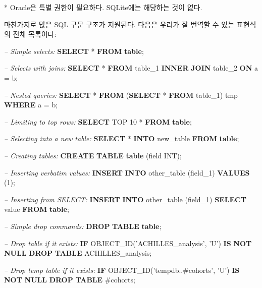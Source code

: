 \documentclass[10.5pt]{book}
\newenvironment{Shaded}{\begin{snugshade}}{\end{snugshade}}
\newcommand{\KeywordTok}[1]{\textcolor[rgb]{0.13,0.29,0.53}{\textbf{#1}}}
\newcommand{\DataTypeTok}[1]{\textcolor[rgb]{0.13,0.29,0.53}{#1}}
\newcommand{\DecValTok}[1]{\textcolor[rgb]{0.00,0.00,0.81}{#1}}
\newcommand{\StringTok}[1]{\textcolor[rgb]{0.31,0.60,0.02}{#1}}
\newcommand{\CommentTok}[1]{\textcolor[rgb]{0.56,0.35,0.01}{\textit{#1}}}
\newcommand{\FunctionTok}[1]{\textcolor[rgb]{0.00,0.00,0.00}{#1}}
\newcommand{\NormalTok}[1]{#1}
\theoremstyle{definition}
\theoremstyle{definition}
\theoremstyle{definition}
\theoremstyle{remark}
\begin{document}
* Oracle은 특별 권한이 필요하다. SQLite에는 해당하는 것이 없다.

마찬가지로 많은 SQL 구문 구조가 지원된다. 다음은 우리가 잘 번역할 수
있는 표현식의 전체 목록이다:

\begin{Shaded}
\begin{Highlighting}[]
\CommentTok{-- Simple selects:}
\KeywordTok{SELECT}\NormalTok{ * }\KeywordTok{FROM} \KeywordTok{table}\NormalTok{;}

\CommentTok{-- Selects with joins:}
\KeywordTok{SELECT}\NormalTok{ * }\KeywordTok{FROM}\NormalTok{ table_1 }\KeywordTok{INNER} \KeywordTok{JOIN}\NormalTok{ table_2 }\KeywordTok{ON}\NormalTok{ a = b;}

\CommentTok{-- Nested queries:}
\KeywordTok{SELECT}\NormalTok{ * }\KeywordTok{FROM}\NormalTok{ (}\KeywordTok{SELECT}\NormalTok{ * }\KeywordTok{FROM}\NormalTok{ table_1) tmp }\KeywordTok{WHERE}\NormalTok{ a = b;}

\CommentTok{-- Limiting to top rows:}
\KeywordTok{SELECT}\NormalTok{ TOP }\DecValTok{10}\NormalTok{ * }\KeywordTok{FROM} \KeywordTok{table}\NormalTok{;}

\CommentTok{-- Selecting into a new table:}
\KeywordTok{SELECT}\NormalTok{ * }\KeywordTok{INTO}\NormalTok{ new_table }\KeywordTok{FROM} \KeywordTok{table}\NormalTok{;}

\CommentTok{-- Creating tables:}
\KeywordTok{CREATE} \KeywordTok{TABLE} \KeywordTok{table}\NormalTok{ (field }\DataTypeTok{INT}\NormalTok{);}

\CommentTok{-- Inserting verbatim values:}
\KeywordTok{INSERT} \KeywordTok{INTO}\NormalTok{ other_table (field_1) }\KeywordTok{VALUES}\NormalTok{ (}\DecValTok{1}\NormalTok{);}

\CommentTok{-- Inserting from SELECT:}
\KeywordTok{INSERT} \KeywordTok{INTO}\NormalTok{ other_table (field_1) }\KeywordTok{SELECT} \FunctionTok{value} \KeywordTok{FROM} \KeywordTok{table}\NormalTok{;}

\CommentTok{-- Simple drop commands:}
\KeywordTok{DROP} \KeywordTok{TABLE} \KeywordTok{table}\NormalTok{;}

\CommentTok{-- Drop table if it exists:}
\KeywordTok{IF}\NormalTok{ OBJECT_ID(}\StringTok{'ACHILLES_analysis'}\NormalTok{, }\StringTok{'U'}\NormalTok{) }\KeywordTok{IS} \KeywordTok{NOT} \KeywordTok{NULL}
  \KeywordTok{DROP} \KeywordTok{TABLE}\NormalTok{ ACHILLES_analysis;}

\CommentTok{-- Drop temp table if it exists:}
\KeywordTok{IF}\NormalTok{ OBJECT_ID(}\StringTok{'tempdb..#cohorts'}\NormalTok{, }\StringTok{'U'}\NormalTok{) }\KeywordTok{IS} \KeywordTok{NOT} \KeywordTok{NULL}
  \KeywordTok{DROP} \KeywordTok{TABLE}\NormalTok{ #cohorts;}


\end{Highlighting}
\end{Shaded}
\end{document}
